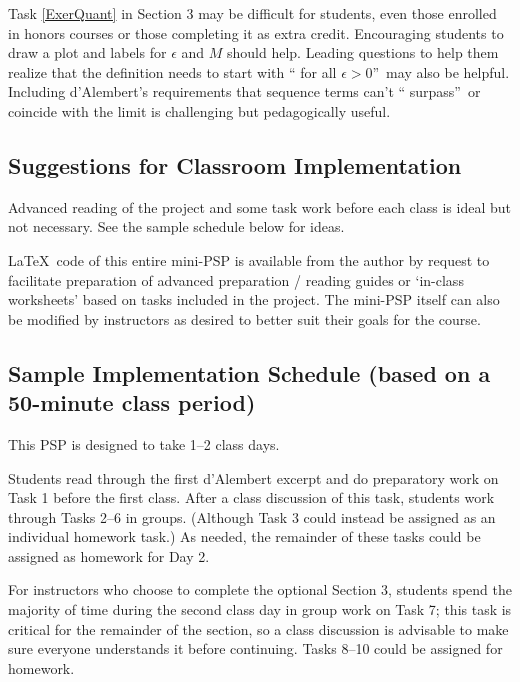 \documentclass[11pt]{article}%
\begin{document}
Task \ref{ExerQuant} in Section 3 may be difficult for students, even those enrolled in honors courses or those completing it as extra credit.  Encouraging students to
draw a plot and labels for $\epsilon$ and $M$ should help. Leading questions
to help them realize that the definition needs to start with \textquotedblleft
for all $\epsilon>0$\textquotedblright\ may also be helpful. Including
d'Alembert's requirements that sequence terms can't \textquotedblleft
surpass\textquotedblright\ or coincide with the limit is challenging but
pedagogically useful.


 \vspace*{-6pt}
\subsection*{Suggestions for Classroom Implementation}
\vspace*{-3pt}

Advanced reading of the project and some task work before each class is ideal
but not necessary. See the sample schedule below for ideas.

\LaTeX\thinspace\ code of this entire mini-PSP is available from the author by
request to facilitate preparation of advanced preparation / reading guides or
`in-class worksheets' based on tasks included in the project. The mini-PSP
itself can also be modified by instructors as desired to better suit their
goals for the course.


 \vspace*{-6pt}
\subsection*{Sample Implementation Schedule (based on a 50-minute class
period)}

\vspace*{-3pt}

This PSP is designed to take 1--2 class days.

Students read through the first d'Alembert excerpt and do preparatory work on Task 1 before the
first class. After a class discussion of this task, students work through
Tasks 2--6 in groups. (Although Task 3 could instead be assigned as an individual homework task.) As needed, the remainder of these tasks could be assigned as homework for Day 2.

For instructors who choose to complete the optional Section 3, students spend the majority of time during the second class day in group work on Task 7;  this task  is critical for the remainder of the section, so a class discussion
 is advisable to make sure everyone understands it before continuing. Tasks 8--10
could be assigned for homework.
\end{document}
